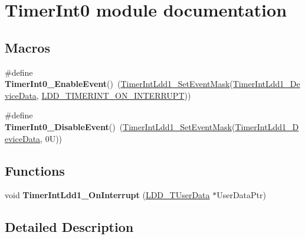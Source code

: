 \hypertarget{group___timer_int0__module}{}\section{Timer\+Int0 module documentation}
\label{group___timer_int0__module}
\subsection*{Macros}
\begin{DoxyCompactItemize}
\item 
\mbox{\label{group___timer_int0__module_ga698917e901c5e4a0f3940466ea63bcba}} 
\#define {\bfseries Timer\+Int0\+\_\+\+Enable\+Event}()~(\hyperlink{group___timer_int_ldd1__module_gaf99e15010d993ffdbc1d2eb08d4d229d}{Timer\+Int\+Ldd1\+\_\+\+Set\+Event\+Mask}(\hyperlink{group___timer_int_ldd1__module_ga5029b1a3ee62b1e77252cb5ee432e572}{Timer\+Int\+Ldd1\+\_\+\+Device\+Data}, \hyperlink{group___p_e___types__module_gad4a95a8e3f3036e88f99c792431b4d72}{L\+D\+D\+\_\+\+T\+I\+M\+E\+R\+I\+N\+T\+\_\+\+O\+N\+\_\+\+I\+N\+T\+E\+R\+R\+U\+PT}))
\item 
\mbox{\label{group___timer_int0__module_ga3d741c5487d7a0bee16b98b9947269b7}} 
\#define {\bfseries Timer\+Int0\+\_\+\+Disable\+Event}()~(\hyperlink{group___timer_int_ldd1__module_gaf99e15010d993ffdbc1d2eb08d4d229d}{Timer\+Int\+Ldd1\+\_\+\+Set\+Event\+Mask}(\hyperlink{group___timer_int_ldd1__module_ga5029b1a3ee62b1e77252cb5ee432e572}{Timer\+Int\+Ldd1\+\_\+\+Device\+Data}, 0\+U))
\end{DoxyCompactItemize}
\subsection*{Functions}
\begin{DoxyCompactItemize}
\item 
\mbox{\label{group___timer_int0__module_ga54442f7694fc9c73818c8e5985597415}} 
void {\bfseries Timer\+Int\+Ldd1\+\_\+\+On\+Interrupt} (\hyperlink{group___p_e___types__module_ga0b66a73f87238a782318aa0be7578e35}{L\+D\+D\+\_\+\+T\+User\+Data} $\ast$User\+Data\+Ptr)
\end{DoxyCompactItemize}


\subsection{Detailed Description}
